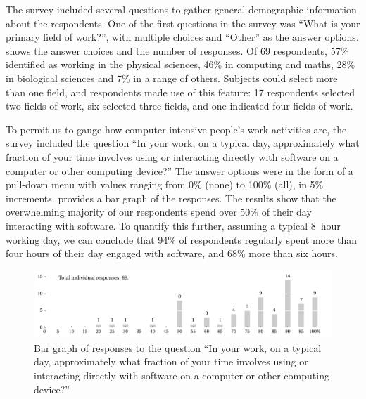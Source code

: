 \documentclass{casicswhitepaper}
\newcommand{\totalrespondents}{69\xspace}
\begin{document}
The survey included several questions to gather general demographic information about the respondents.  One of the first questions in the survey was ``What is your primary field of work?'', with multiple choices and ``Other'' as the answer options.   shows the answer choices and the number of responses.  Of \totalrespondents respondents, 57\% identified as working in the physical sciences, 46\% in computing and maths, 28\% in biological sciences and 7\% in a range of others.  Subjects could select more than one field, and respondents made use of this feature: 17 respondents selected two fields of work, six selected three fields, and one indicated four fields of work.

To permit us to gauge how computer-intensive people's work activities are, the survey included the question ``In your work, on a typical day, approximately what fraction of your time involves using or interacting directly with software on a computer or other computing device?''  The answer options were in the form of a pull-down menu with values ranging from 0\% (none) to 100\% (all), in 5\% increments.   provides a bar graph of the responses.  The results show that the overwhelming majority of our respondents spend over 50\% of their day interacting with software.  To quantify this further, assuming a typical 8~hour working day, we can conclude that 94\% of respondents regularly spent more than four hours of their day engaged with software, and 68\% more than six hours.

\begin{figure}[bht]
  \centering
  \includegraphics[trim=0.1in 0.1in 0 0,width=6.25in]{files/plots/bar-graph-time-spent-with-software.pdf}
  \caption{Bar graph of responses to the question ``In your work, on a
    typical day, approximately what fraction of your time involves using or
    interacting directly with software on a computer or other computing
    device?''}
  \label{time-with-software}
\end{figure}
\end{document}
